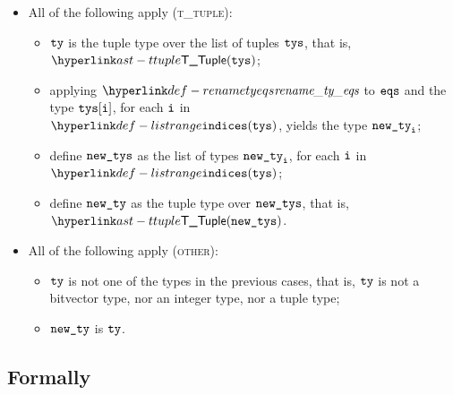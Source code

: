 \begin{itemize}
  \item All of the following apply (\textsc{t\_tuple}):
  \begin{itemize}
    \item $\texttt{ty}$ is the tuple type over the list of tuples $\texttt{tys}$, that is, $\TTuple(\tys)$;
    \item applying $\renametyeqs$ to $\texttt{eqs}$ and the type $\texttt{tys}[\texttt{i}]$, for each $\texttt{i}$ in \\
          $\listrange(\tys)$, yields the type $\texttt{new\_ty}_{\texttt{i}}$;
    \item define $\texttt{new\_tys}$ as the list of types $\texttt{new\_ty}_{\texttt{i}}$, for each $\texttt{i}$ in $\listrange(\tys)$;
    \item define $\texttt{new\_ty}$ as the tuple type over $\texttt{new\_tys}$, that is, $\TTuple(\newtys)$.
  \end{itemize}

  \item All of the following apply (\textsc{other}):
  \begin{itemize}
    \item $\texttt{ty}$ is not one of the types in the previous cases,
          that is, $\texttt{ty}$ is not a bitvector type, nor an integer type, nor a tuple type;
    \item $\texttt{new\_ty}$ is $\texttt{ty}$.
  \end{itemize}
\end{itemize}

\subsection{Formally}

